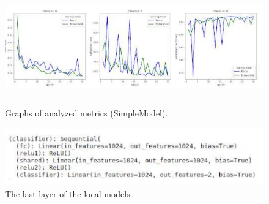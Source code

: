 \documentclass[twotcolumn]{scndocument}
\begin{document}
\begin{figure}[H]
  \centering
    \includegraphics[width=17cm,height=5cm]{image3.png}
  \caption{Graphs of analyzed metrics (SimpleModel).}
\end{figure} 
\begin{figure}[H]
  \centering
    \includegraphics[width=12cm,height=2.5cm]{image4.png}
  \caption{The last layer of the local models.}
\end{figure}
\end{document}
